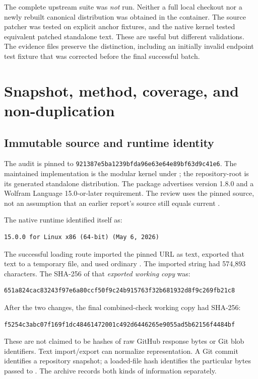 \documentclass[11pt,a4paper]{article}
\newcommand{\code}[1]{\texttt{\detokenize{#1}}}
\begin{document}
The complete upstream suite was \emph{not} run. Neither a full local checkout nor a newly rebuilt canonical distribution was obtained in the container. The source patcher was tested on explicit anchor fixtures, and the native kernel tested equivalent patched standalone text. These are useful but different validations. The evidence files preserve the distinction, including an initially invalid endpoint test fixture that was corrected before the final successful batch.

\section{Snapshot, method, coverage, and non-duplication}
\subsection{Immutable source and runtime identity}
The audit is pinned to \nolinkurl{921387e5ba1239bfda96e63e64e89bf63d9c41e6}. The maintained implementation is the modular kernel under ; the repository-root  is its generated standalone distribution. The package advertises version 1.8.0 and a Wolfram Language 15.0-or-later requirement. The review uses the pinned source, not an assumption that an earlier report's source still equals current \code{main}.\cite{readme,core,review-status}

The native runtime identified itself as:
\begin{lstlisting}
15.0.0 for Linux x86 (64-bit) (May 6, 2026)
\end{lstlisting}
The successful loading route imported the pinned URL as text, exported that text to a temporary file, and used ordinary \code{Get}. The imported string had 574,893 characters. The SHA-256 of that \emph{exported working copy} was:
\begin{lstlisting}
651a824cac83243f97e6a80ccf50f9c24b915763f32b681932d8f9c269fb21c8
\end{lstlisting}
After the two changes, the final combined-check working copy had SHA-256:
\begin{lstlisting}
f5254c3abc07f169f1dc48461472001c492d6446265e9055ad5b62156f4484bf
\end{lstlisting}
These are not claimed to be hashes of raw GitHub response bytes or Git blob identifiers. Text import/export can normalize representation. A Git commit identifies a repository snapshot; a loaded-file hash identifies the particular bytes passed to \code{Get}. The archive records both kinds of information separately.
\end{document}

